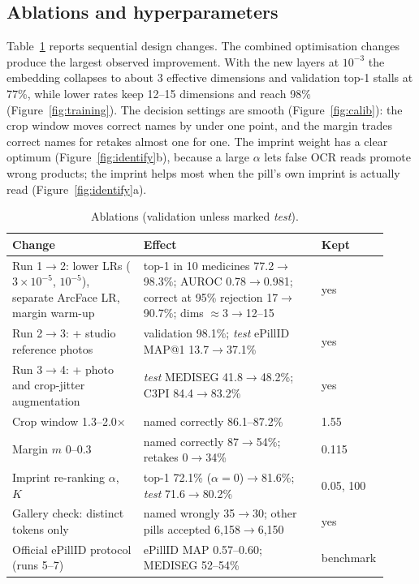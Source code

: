 \subsection{Ablations and hyperparameters}
\label{sec:ablations}

Table~\ref{tab:ablation} reports sequential design changes. The combined optimisation changes produce the largest observed improvement. With the new layers at
$10^{-3}$ the embedding collapses to about 3 effective dimensions and validation top-1 stalls at 77\%, while lower rates
keep 12--15 dimensions and reach 98\% (Figure~\ref{fig:training}). The decision settings are smooth
(Figure~\ref{fig:calib}): the crop window moves correct names by under one point, and the margin trades correct names
for retakes almost one for one. The imprint weight has a clear optimum (Figure~\ref{fig:identify}b), because a large
$\alpha$ lets false OCR reads promote wrong products; the imprint helps most when the pill's own imprint is actually
read (Figure~\ref{fig:identify}a).

\begin{table}[t]
  \caption{Ablations (validation unless marked \emph{test}).}
  \label{tab:ablation}
  \centering
  \small
  \begin{tabular}{@{}p{0.34\linewidth}p{0.46\linewidth}p{0.12\linewidth}@{}}
    \toprule
    Change & Effect & Kept \\
    \midrule
    Run 1$\to$2: lower LRs ($3{\times}10^{-5}$, $10^{-5}$), separate ArcFace LR, margin warm-up & top-1 in 10
      medicines 77.2$\to$98.3\%; AUROC 0.78$\to$0.981; correct at 95\% rejection 17$\to$90.7\%; dims
      $\approx$3$\to$12--15 & yes \\
    Run 2$\to$3: + studio reference photos & validation 98.1\%; \emph{test} ePillID MAP@1 13.7$\to$37.1\% & yes \\
    Run 3$\to$4: + photo and crop-jitter augmentation & \emph{test} MEDISEG 41.8$\to$48.2\%; C3PI 84.4$\to$83.2\%
      & yes \\
    Crop window 1.3--2.0$\times$ & named correctly 86.1--87.2\% & 1.55 \\
    Margin $m$ 0--0.3 & named correctly 87$\to$54\%; retakes 0$\to$34\% & 0.115 \\
    Imprint re-ranking $\alpha$, $K$ & top-1 72.1\% ($\alpha{=}0$)$\to$81.6\%; \emph{test} 71.6$\to$80.2\%
      & 0.05, 100 \\
    Gallery check: distinct tokens only & named wrongly 35$\to$30; other pills accepted 6,158$\to$6,150 & yes \\
    Official ePillID protocol (runs 5--7) & ePillID MAP 0.57--0.60; MEDISEG 52--54\% & benchmark \\
    \bottomrule
  \end{tabular}
\end{table}

